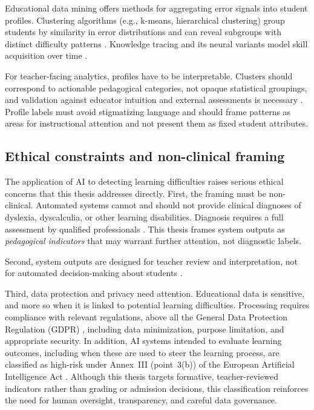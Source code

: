 Educational data mining offers methods for aggregating error signals into student profiles. Clustering algorithms (e.g., k-means, hierarchical clustering) group students by similarity in error distributions and can reveal subgroups with distinct difficulty patterns \parencite{BakerYacef2009,RomeroVentura2010EDM}. Knowledge tracing and its neural variants model skill acquisition over time \parencite{CorbettAnderson1995,Piech2015}.

For teacher-facing analytics, profiles have to be interpretable. Clusters should correspond to actionable pedagogical categories, not opaque statistical groupings, and validation against educator intuition and external assessments is necessary \parencite{RomeroVentura2024}. Profile labels must avoid stigmatizing language and should frame patterns as areas for instructional attention and not present them as fixed student attributes.

\subsection{Ethical constraints and non-clinical framing}
\label{sec:sota_ethics_ethical}

The application of AI to detecting learning difficulties raises serious ethical concerns that this thesis addresses directly. First, the framing must be non-clinical. Automated systems cannot and should not provide clinical diagnoses of dyslexia, dyscalculia, or other learning disabilities. Diagnosis requires a full assessment by qualified professionals \parencite{ShaywitzShaywitz2005}. This thesis frames system outputs as \emph{pedagogical indicators} that may warrant further attention, not diagnostic labels.

Second, system outputs are designed for teacher review and interpretation, not for automated decision-making about students \parencite{Woolf2010}.

Third, data protection and privacy need attention. Educational data is sensitive, and more so when it is linked to potential learning difficulties. Processing requires compliance with relevant regulations, above all the General Data Protection Regulation (GDPR) \parencite{EU2016GDPR}, including data minimization, purpose limitation, and appropriate security. In addition, AI systems intended to evaluate learning outcomes, including when these are used to steer the learning process, are classified as high-risk under Annex~III (point~3(b)) of the European Artificial Intelligence Act \parencite{EU2024AIAct}. Although this thesis targets formative, teacher-reviewed indicators rather than grading or admission decisions, this classification reinforces the need for human oversight, transparency, and careful data governance.

